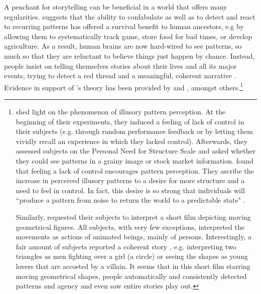 \documentclass[11pt,a4paper,english,oneside]{book}
\numberwithin{equation}{chapter}
\begin{document}
A penchant for storytelling can be beneficial in a world that offers many regularities. \citeauthor{Atran.2010} suggests that the ability to confabulate as well as to detect and react to recurring patterns has offered a survival benefit to human ancestors, e.g by allowing them to systematically track game, store food for bad times, or develop agriculture. As a result, human brains are now hard-wired to see patterns, so much so that they are  reluctant  to believe things just happen by chance. Instead, people  insist on telling themselves stories about their lives and all its major events, trying   to  detect  a  red thread 
and a meaningful, coherent  narrative \cite[pp.~435--436]{Atran.2010}. Evidence in support of \citeauthor{Atran.2010}'s theory has been provided by \citet{Whitson.2008} and \cite{HeiderF.andSimmelM..}, amongst others.\footnote{\citet{Whitson.2008} shed light on the phenomenon of illusory pattern perception. At the beginning of their experiments, they induced a feeling of lack of control in their subjects (e.g. through random performance feedback or by letting them vividly recall an experience in which they lacked control). Afterwards, they assessed subjects on the Personal Need for Structure Scale and asked whether they could see patterns in a grainy image or stock market information. \citeauthor{Whitson.2008} found that feeling a lack of control encourages pattern perception. They ascribe the increase in perceived illusory patterns to a desire for more structure and a need to feel in control. In fact, this desire is so strong that individuals will ``produce a pattern from noise to return the world to a predictable state" \citep[p.~117]{Whitson.2008}.
		
Similarly, \cite{HeiderF.andSimmelM..} requested their subjects to interpret a short film depicting moving geometrical figures. All subjects, with very few exceptions, interpreted the movements as actions of animated beings, mainly of persons. Interestingly, a fair amount of subjects reported a coherent story \citep[~p. 246]{HeiderF.andSimmelM..}, e.g. interpreting two triangles as men fighting over a girl (a circle) or seeing the shapes as young lovers that are accosted by a villain. It seems that in this short film starring moving geometrical shapes, people automatically and consistently detected patterns and agency and even saw entire stories play out. }
\end{document}
